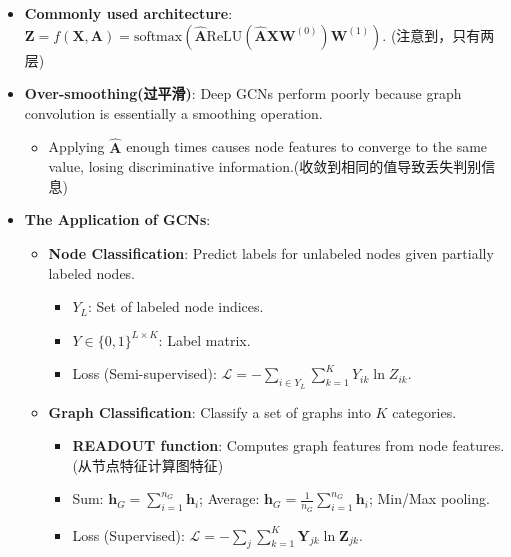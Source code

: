 \documentclass[UTF8]{ctexart}
\begin{document}
\begin{itemize}
\begin{enumerate}
        \item Renormalization trick: $\mathbf{I} + \mathbf{D}^{-1/2}\mathbf{A}\mathbf{D}^{-1/2} \to \tilde{\mathbf{D}}^{-1/2}\tilde{\mathbf{A}}\tilde{\mathbf{D}}^{-1/2} = \hat{\mathbf{A}}$.\newline
    (反正是 optional, 看一眼得了, 叽里咕噜也不知道在说什么)
    \end{enumerate}
    \item \textbf{Commonly used architecture}: $\mathbf{Z} = f(\mathbf{X}, \mathbf{A}) = \text{softmax}(\hat{\mathbf{A}} \text{ReLU}(\hat{\mathbf{A}}\mathbf{X}\mathbf{W}^{(0)})\mathbf{W}^{(1)})$. (注意到，只有两层)
    \item \textbf{Over-smoothing(过平滑)}: Deep GCNs perform poorly because graph convolution is essentially a smoothing operation. 
    \begin{itemize}
        \item Applying $\hat{\mathbf{A}}$ enough times causes node features to converge to the same value, 
        losing discriminative information.(收敛到相同的值导致丢失判别信息)
    \end{itemize}
    \item \textbf{The Application of GCNs}:
    \begin{itemize}
        \item \textbf{Node Classification}: Predict labels for unlabeled nodes given partially labeled nodes.
        \begin{itemize}
            \item $Y_L$: Set of labeled node indices.
            \item $Y \in \{0,1\}^{L \times K}$: Label matrix.
            \item Loss (Semi-supervised): $\mathcal{L} = - \sum_{i \in Y_L} \sum_{k=1}^K Y_{ik} \ln Z_{ik}$.
        \end{itemize}
        \item \textbf{Graph Classification}: Classify a set of graphs into $K$ categories.
        \begin{itemize}
            \item \textbf{READOUT function}: Computes graph features from node features.(从节点特征计算图特征)
            \item Sum: $\mathbf{h}_G = \sum_{i=1}^{n_G} \mathbf{h}_i$; Average: $\mathbf{h}_G = \frac{1}{n_G} \sum_{i=1}^{n_G} \mathbf{h}_i$; Min/Max pooling.
            \item Loss (Supervised): $\mathcal{L} = - \sum_j \sum_{k=1}^K \mathbf{Y}_{jk} \ln \mathbf{Z}_{jk}$.

\end{itemize}
\end{itemize}
\end{itemize}
\end{document}

